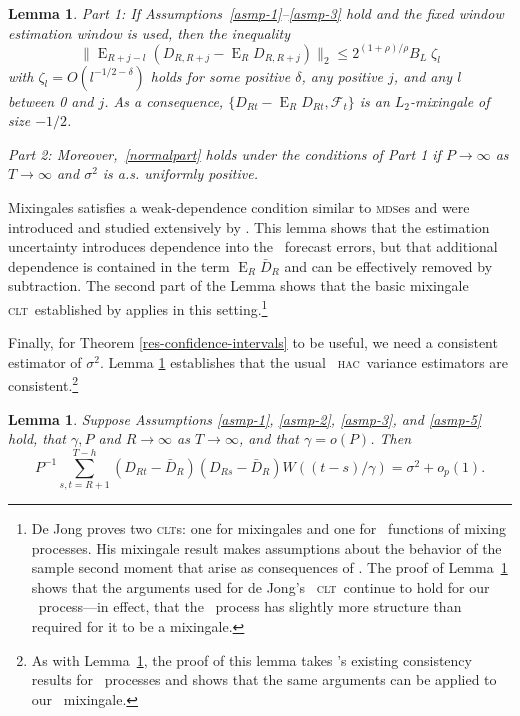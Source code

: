 \documentclass[11pt]{article}
\newtheorem{lem}[thm]{Lemma}
\DeclareMathOperator{\E}{E}
\newcommand{\citepos}[1]{\citeauthor{#1}'s \citeyearpar{#1}}
\newcommand{\oosA}{\bar{D}_{R}}
\newcommand{\oosSum}[2]{\ensuremath{\sum_{#1=R+#2}^{T-\h}}}
\newcommand{\h}{h}
\newcommand{\vWeight}{W((t-s)/\gamma)}
\newcommand{\couplingConstant}{\ensuremath{2^{(1+\rho)/\rho} B_L}}
\newcommand{\mds}{\textsc{mds}}
\newcommand{\clt}{\textsc{clt}}
\newcommand{\hac}{\textsc{hac}}
\begin{document}
\begin{lem}\label{res-mixingale}
  Part 1: If Assumptions~\ref{asmp-1}--\ref{asmp-3} hold and the fixed
  window estimation window is used, then the inequality
  \begin{equation}\label{mixingaleR}
    \lVert \E_{R+j-l}(D_{R,R+j} - \E_R D_{R,R+j}) \rVert_2 \leq
    \couplingConstant \;
    \zeta_l
  \end{equation}
  with $\zeta_l = O(l^{-1/2 - \delta})$ holds for some positive
  $\delta$, any positive $j$, and any $l$ between 0 and $j$.  As a
  consequence, $\{D_{Rt} - \E_R D_{Rt}, \mathcal F_t\}$ is an
  $L_2$-mixingale of size $-1/2$.  

  \noindent Part 2: Moreover,~\eqref{normalpart} holds under the
  conditions of Part 1 if $P \to \infty$ as $T \to \infty$ and
  $\sigma^2$ is a.s. uniformly positive.
\end{lem}

Mixingales satisfies a weak-dependence condition similar to \mds es
and were introduced and studied extensively by
\citet{Mcl:74,Mcl:75,Mcl:75b,Mcl:77}.  This lemma shows that the
estimation uncertainty introduces dependence into the \oos\ forecast
errors, but that additional dependence is contained in the term $\E_R
\oosA$ and can be effectively removed by subtraction.  The second
part of the Lemma shows that the basic mixingale \clt\ established by
\citet{Jon:97} applies in this setting.\footnote{De Jong proves two
  \clt s: one for mixingales and one for \ned\ functions of mixing
  processes.  His mixingale result makes assumptions about the
  behavior of the sample second moment that arise as consequences of
  \ned.  The proof of Lemma~\ref{res-mixingale} shows that the
  arguments used for de Jong's \ned\ \clt\ continue to hold for our
  \oos\ process---in effect, that the \oos\ process has slightly more
  structure than required for it to be a mixingale.}

Finally, for Theorem \ref{res-confidence-intervals} to be useful, we
need a consistent estimator of $\sigma^2$. Lemma
\ref{res-variance-estimator} establishes that the usual \oos\ \hac\
variance estimators are consistent.\footnote{As with
      Lemma~\ref{res-mixingale}, the proof of this lemma takes
      \citepos{JoD:00} existing consistency results
      for \ned\ processes and shows that the same arguments can be
      applied to our \oos\ mixingale.}

\begin{lem}
  \label{res-variance-estimator} Suppose Assumptions \ref{asmp-1},
  \ref{asmp-2}, \ref{asmp-3}, and \ref{asmp-5} hold, that $\gamma, P$
  and $R \to \infty$ as $T \to \infty$, and that $\gamma = o(P)$.
  Then
  \begin{equation*}
    P^{-1} \oosSum{s,t}{1} (D_{Rt} - \oosA)(D_{Rs} - \oosA)
    \vWeight = \sigma^2 + o_p(1).
  \end{equation*}
\end{lem}
\end{document}
